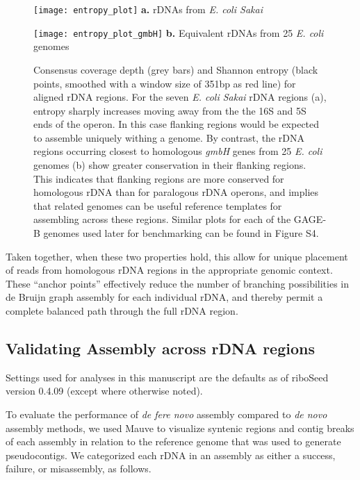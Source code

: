 \documentclass[a4,center,fleqn]{NAR}
\begin{document}
\begin{figure*}[t]
  \centering
  \begin{minipage}{.5\textwidth}
  \centering
      \texttt{[image: entropy\_plot]}
      {\footnotesize \textbf{a.} rDNAs from \textit{E. coli Sakai}}
  \end{minipage}%
  \begin{minipage}{.5\textwidth}
  \centering
      \texttt{[image: entropy\_plot\_gmbH]}
      {\footnotesize\textbf{b.} Equivalent rDNAs from 25 \textit{E. coli} genomes}
  \end{minipage}%

  \caption{
    Consensus coverage depth (grey bars) and Shannon entropy (black points, smoothed with a window size of 351bp as red line) for aligned rDNA regions. For the seven \textit{E. coli Sakai} rDNA regions (a), entropy sharply increases moving away from the the 16S and 5S ends of the operon. In this case flanking regions would be expected to assemble uniquely withing a genome. By contrast, the rDNA regions occurring closest to homologous \textit{gmbH} genes from 25 \textit{E. coli} genomes (b) show greater conservation in their flanking regions. This indicates that flanking regions are more conserved for homologous rDNA than for paralogous rDNA operons, and implies that related genomes can be useful reference templates for assembling across these regions. Similar plots for each of the GAGE-B genomes used later for benchmarking can be found in Figure S4.
  }
  \label{fig:entropy}
\end{figure*}

Taken together, when these two properties hold, this allow for unique placement of reads from homologous rDNA regions in the appropriate genomic context. These ``anchor points'' effectively reduce the number of branching possibilities in de Bruijn graph assembly for each individual rDNA, and thereby permit a complete balanced path through the full rDNA region.


\subsection*{Validating Assembly across rDNA regions}

Settings used for analyses in this manuscript are the defaults as of riboSeed version 0.4.09 (except where otherwise noted).


To evaluate the performance of \textit{de fere novo} assembly compared to \textit{de novo} assembly methods, we used Mauve to visualize syntenic regions and contig breaks of each assembly in relation to the reference genome that was used to generate pseudocontigs. We categorized each rDNA in an assembly as either a success, failure, or misassembly, as follows.
\end{document}
